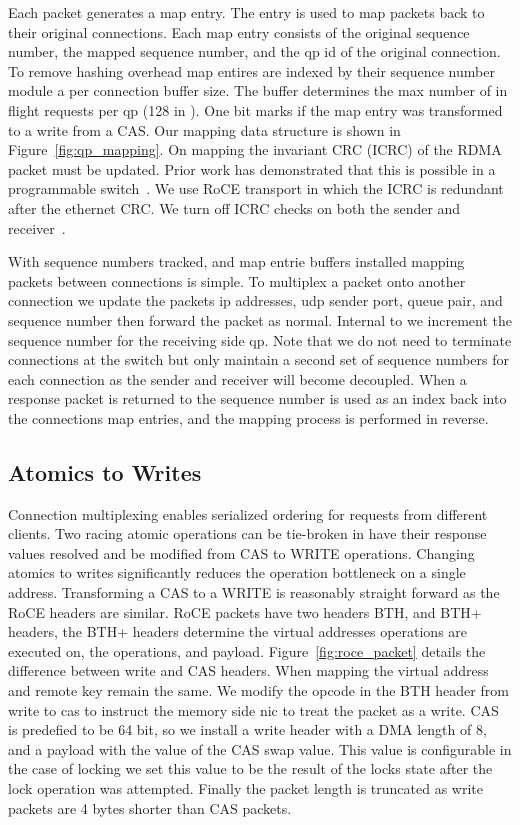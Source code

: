 Each packet generates a map entry. The entry is used to map
packets back to their original connections. Each map entry
consists of the original sequence number, the mapped
sequence number, and the qp id of the original connection.
To remove hashing overhead map entires are indexed by their
sequence number module a per connection buffer size. The
buffer determines the max number of in flight requests per
qp (128 in \sword). One bit marks if the map entry was
transformed to a write from a CAS. Our mapping data structure is shown in Figure~\ref{fig:qp_mapping}.
On mapping the invariant CRC (ICRC) of the RDMA packet must
be updated. Prior work has demonstrated that this is
possible in a programmable switch~. We use RoCE
transport in which the ICRC is redundant after the ethernet
CRC. We turn off ICRC checks on both the sender and
receiver~\cite{switchml}.

With sequence numbers tracked, and map entrie buffers
installed mapping packets between connections is simple. To
multiplex a packet onto another connection we update the
packets ip addresses, udp sender port, queue pair, and
sequence number then forward the packet as normal. Internal
to {\sword} we increment the sequence number for the
receiving side qp. Note that we do not need to terminate
connections at the switch but only maintain a second set of
sequence numbers for each connection as the sender and
receiver will become decoupled. When a response packet is
returned to {\sword} the sequence number is used as an index
back into the connections map entries, and the mapping
process is performed in reverse.

\subsection{Atomics to Writes}

Connection multiplexing enables serialized ordering for
requests from different clients. Two racing atomic
operations can be tie-broken in {\sword} have their response
values resolved and be modified from CAS to WRITE
operations. Changing atomics to writes significantly reduces
the operation bottleneck on a single address. 
Transforming a CAS to a WRITE is reasonably straight forward
as the RoCE headers are similar. RoCE packets have two
headers BTH, and BTH+ headers, the BTH+ headers determine
the virtual addresses operations are executed on, the
operations, and payload. Figure~\ref{fig:roce_packet} details
the difference between write and CAS headers. When mapping
the virtual address and remote key remain the same. We
modify the opcode in the BTH header from write to cas to
instruct the memory side nic to treat the packet as a write.
CAS is predefied to be 64 bit, so we install a write header
with a DMA length of 8, and a payload with the value of the
CAS swap value. This value is configurable in the case of
locking we set this value to be the result of the locks
state after the lock operation was attempted. Finally the
packet length is truncated as write packets are 4 bytes
shorter than CAS packets.

